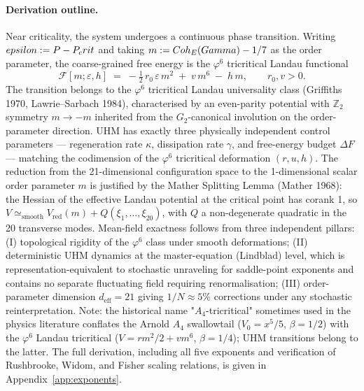 \paragraph{Derivation outline.}
Near criticality, the system undergoes a continuous phase transition. Writing
$epsilon := P - P_crit$ and taking $m := Coh_E(Gamma) - 1/7$ as the order
parameter, the coarse-grained free energy is the $\varphi^{6}$ tricritical
Landau functional
\begin{equation*}
  \mathcal{F}[m;\varepsilon, h] \;=\;
    -\tfrac{1}{2}\,r_0\,\varepsilon\, m^2
    \;+\; v\, m^6 \;-\; h\, m,
  \qquad r_0, v > 0.
\end{equation*}
The transition belongs to the $\varphi^6$ tricritical Landau universality class
(Griffiths 1970, Lawrie–Sarbach 1984), characterised by an even-parity potential
with $\mathbb{Z}_2$ symmetry $m \to -m$ inherited from the $G_2$-canonical involution
on the order-parameter direction. UHM has exactly three physically independent
control parameters --- regeneration rate $\kappa$, dissipation rate $\gamma$, and
free-energy budget $\Delta F$ --- matching the codimension of the $\varphi^6$ tricritical
deformation $(r, u, h)$. The reduction from the 21-dimensional configuration space
to the 1-dimensional scalar order parameter $m$ is justified by the Mather Splitting
Lemma (Mather 1968): the Hessian of the effective Landau potential at the critical
point has corank 1, so $V \simeq_\mathrm{smooth} V_\mathrm{red}(m) + Q(\xi_1,\ldots,\xi_{20})$,
with $Q$ a non-degenerate quadratic in the 20 transverse modes. Mean-field exactness
follows from three independent pillars: (I) topological rigidity of the $\varphi^6$
class under smooth deformations; (II) deterministic UHM dynamics at the master-equation
(Lindblad) level, which is representation-equivalent to stochastic unraveling for
saddle-point exponents and contains no separate fluctuating field requiring renormalisation;
(III) order-parameter dimension $d_\mathrm{eff} = 21$ giving $1/N \approx 5\%$ corrections
under any stochastic reinterpretation. Note: the historical name "$A_4$-tricritical"
sometimes used in the physics literature conflates the Arnold $A_4$ swallowtail
($V_0 = x^5/5$, $\beta = 1/2$) with the $\varphi^6$ Landau tricritical ($V = rm^2/2 + vm^6$,
$\beta = 1/4$); UHM transitions belong to the latter. The full derivation, including
all five exponents and verification of Rushbrooke, Widom, and Fisher scaling relations,
is given in Appendix~\ref{app:exponents}.

